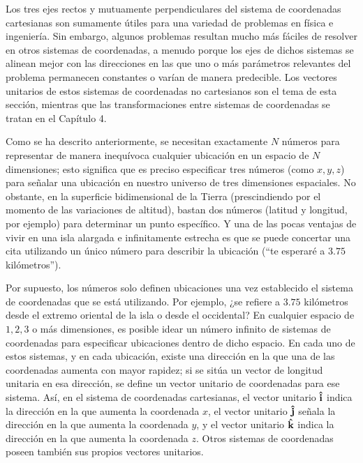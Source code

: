 \documentclass[hidelinks,12pt]{article}
\begin{document}
Los tres ejes rectos y mutuamente perpendiculares del sistema de coordenadas cartesianas son sumamente útiles para una variedad de problemas en física e ingeniería. Sin embargo, algunos problemas resultan mucho más fáciles de resolver en otros sistemas de coordenadas, a menudo porque los ejes de dichos sistemas se alinean mejor con las direcciones en las que uno o más parámetros relevantes del problema permanecen constantes o varían de manera predecible. Los vectores unitarios de estos sistemas de coordenadas no cartesianos son el tema de esta sección, mientras que las transformaciones entre sistemas de coordenadas se tratan en el Capítulo 4.
\par
Como se ha descrito anteriormente, se necesitan exactamente $N$ números para representar de manera inequívoca cualquier ubicación en un espacio de $N$ dimensiones; esto significa que es preciso especificar tres números (como $x, y, z$) para señalar una ubicación en nuestro universo de tres dimensiones espaciales. No obstante, en la superficie bidimensional de la Tierra (prescindiendo por el momento de las variaciones de altitud), bastan dos números (latitud y longitud, por ejemplo) para determinar un punto específico. Y una de las pocas ventajas de vivir en una isla alargada e infinitamente estrecha es que se puede concertar una cita utilizando un único número para describir la ubicación (\enquote{te esperaré a $3.75$ kilómetros}).
\par
Por supuesto, los números solo definen ubicaciones una vez establecido el sistema de coordenadas que se está utilizando. Por ejemplo, ¿se refiere a $3.75$ kilómetros desde el extremo oriental de la isla o desde el occidental? En cualquier espacio de $1, 2, 3$ o más dimensiones, es posible idear un número infinito de sistemas de coordenadas para especificar ubicaciones dentro de dicho espacio. En cada uno de estos sistemas, y en cada ubicación, existe una dirección en la que una de las coordenadas aumenta con mayor rapidez; si se sitúa un vector de longitud unitaria en esa dirección, se define un vector unitario de coordenadas para ese sistema. Así, en el sistema de coordenadas cartesianas, el vector unitario $\vu{i}$ indica la dirección en la que aumenta la coordenada $x$, el vector unitario $\vu{j}$ señala la dirección en la que aumenta la coordenada $y$, y el vector unitario $\vu{k}$ indica la dirección en la que aumenta la coordenada $z$. Otros sistemas de coordenadas poseen también sus propios vectores unitarios.
\par
\end{document}
